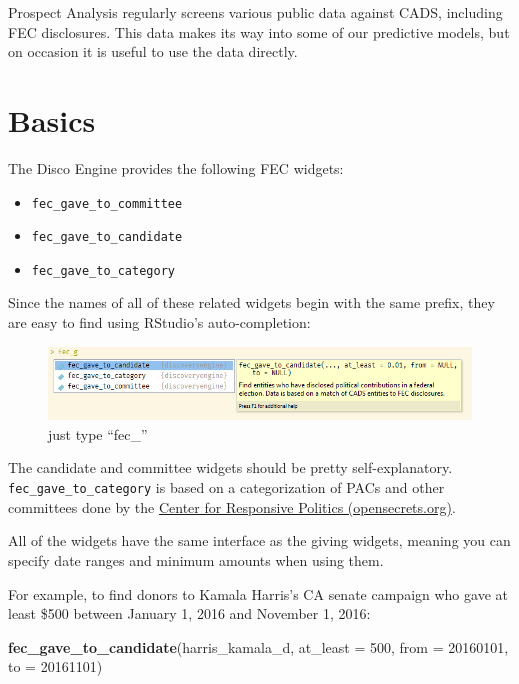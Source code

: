 \documentclass[]{book}
\newenvironment{Shaded}{\begin{snugshade}}{\end{snugshade}}
\newcommand{\DataTypeTok}[1]{\textcolor[rgb]{0.13,0.29,0.53}{#1}}
\newcommand{\DecValTok}[1]{\textcolor[rgb]{0.00,0.00,0.81}{#1}}
\newcommand{\KeywordTok}[1]{\textcolor[rgb]{0.13,0.29,0.53}{\textbf{#1}}}
\newcommand{\NormalTok}[1]{#1}
\providecommand{\tightlist}{%
  \setlength{\itemsep}{0pt}\setlength{\parskip}{0pt}}
\begin{document}
Prospect Analysis regularly screens various public data against CADS, including FEC disclosures. This data makes its way into some of our predictive models, but on occasion it is useful to use the data directly.

\hypertarget{basics}{%
\section{Basics}\label{basics}}

The Disco Engine provides the following FEC widgets:

\begin{itemize}
\tightlist
\item
  \texttt{fec\_gave\_to\_committee}
\item
  \texttt{fec\_gave\_to\_candidate}
\item
  \texttt{fec\_gave\_to\_category}
\end{itemize}

Since the names of all of these related widgets begin with the same prefix, they are easy to find using RStudio's auto-completion:

\begin{figure}
\centering
\includegraphics{images/fec-widgets-autocomplete.png}
\caption{just type ``fec\_''}
\end{figure}

The candidate and committee widgets should be pretty self-explanatory. \texttt{fec\_gave\_to\_category} is based on a categorization of PACs and other committees done by the \href{https://www.opensecrets.org/}{Center for Responsive Politics (opensecrets.org)}.

All of the widgets have the same interface as the giving widgets, meaning you can specify date ranges and minimum amounts when using them.

For example, to find donors to Kamala Harris's CA senate campaign who gave at least \$500 between January 1, 2016 and November 1, 2016:

\begin{Shaded}
\begin{Highlighting}[]
\KeywordTok{fec_gave_to_candidate}\NormalTok{(harris_kamala_d, }\DataTypeTok{at_least =} \DecValTok{500}\NormalTok{, }
                      \DataTypeTok{from =} \DecValTok{20160101}\NormalTok{, }\DataTypeTok{to =} \DecValTok{20161101}\NormalTok{)}
\end{Highlighting}
\end{Shaded}
\end{document}
